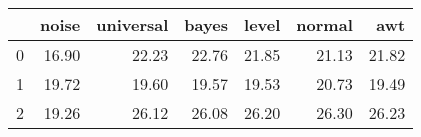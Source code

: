 \begin{tabular}{lrrrrrr}
\toprule
{} &  noise &  universal &  bayes &  level &  normal &    awt \\
\midrule
0 &  16.90 &      22.23 &  22.76 &  21.85 &   21.13 &  21.82 \\
1 &  19.72 &      19.60 &  19.57 &  19.53 &   20.73 &  19.49 \\
2 &  19.26 &      26.12 &  26.08 &  26.20 &   26.30 &  26.23 \\
\bottomrule
\end{tabular}
